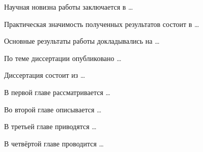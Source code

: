Научная новизна работы заключается в \ldots

Практическая значимость полученных результатов состоит в \ldots

Основные результаты работы докладывались на \ldots

По теме диссертации опубликовано \ldots

Диссертация состоит из \ldots

В первой главе рассматривается \ldots

Во второй главе описывается \ldots

В третьей главе приводятся \ldots

В четвёртой главе проводится \ldots
